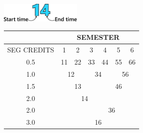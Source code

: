 \begin{center}
\includegraphics[width=0.3\textwidth]{./parts/segment-explain.pdf}

\begin{tabular}{|c|c|c|c|c|c|c|}
    \hline
    & \multicolumn{6}{|c|}{SEMESTER} \\ \hline
    SEG CREDITS & 1 & 2 & 3 & 4 & 5 & 6 \\ \hline
    0.5 & \multicolumn{1}{|c|}{11}& \multicolumn{1}{|c|}{22}& \multicolumn{1}{|c|}{33}& \multicolumn{1}{|c|}{44}& \multicolumn{1}{|c|}{55}& \multicolumn{1}{|c|}{66} \\ \hline
    1.0 &\multicolumn{2}{|c|}{12}& \multicolumn{2}{|c|}{34} & \multicolumn{2}{|c|}{56} \\ \hline
    1.5 &\multicolumn{3}{|c|}{13}& \multicolumn{3}{|c|}{46} \\ \hline
    2.0 &\multicolumn{4}{|c|}{14}& \hspace{2mm} & \hspace{2mm}  \\ \hline
    2.0 & \hspace{2mm} & \hspace{2mm} & \multicolumn{4}{|c|}{36} \\ \hline
    3.0 &\multicolumn{6}{|c|}{16} \\ \hline
\end{tabular}
\end{center}
